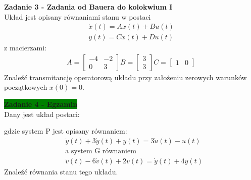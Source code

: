\documentclass[a4paper,11pt]{article}
\begin{document}
\begin{framed}
\textbf{Zadanie 3 - Zadania od Bauera do kolokwium I } \\ 
Układ jest opisany równaniami stanu w postaci
\begin{align*}
\dot{x}(t)=Ax(t)+Bu(t) \\
y(t)=Cx(t)+Du(t)
\end{align*}
z macierzami: \\
\begin{align*}
A = 
\begin{bmatrix}
-4 & -2 \\
0 & 3
\end{bmatrix}
B = 
\begin{bmatrix}
3  \\
3
\end{bmatrix}
C = 
\begin{bmatrix}
1 & 0
\end{bmatrix}
\end{align*}
Znaleźć transmitancję operatorową układu przy założeniu zerowych warunków początkowych \( x(0) = 0 \). 
\end{framed}

\begin{framed}
\textbf{\colorbox{green}{Zadanie 4 - Egzamin}} \\ 
Dany jest układ postaci:
\begin{figure}[H]
\centering
{}
\label{fig:opt_par_1}
\end{figure}
gdzie system P jest opisany równaniem:
\begin{align*}
&\ddot{y}(t)+3\dot{y}(t)+y(t)=3\dot{u}(t)-u(t) \\
&\text{a system G równaniem} \\
&\ddot{v}(t)-6\dot{v}(t)+2v(t)=\dot{y}(t)+4y(t)
\end{align*}
Znaleźć równania stanu tego układu.
\end{framed}
\end{document}
